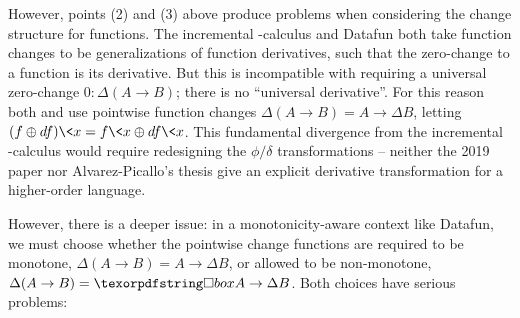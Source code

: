 However, points (2) and (3) above produce problems when considering the change structure for functions.
%
The incremental \fn-calculus and Datafun both take function changes to be generalizations of function derivatives, such that the zero-change to a function is its derivative.
%
But this is incompatible with requiring a universal zero-change $0 : \Delta (A \to B)$; there is no ``universal derivative''.
%
%
For this reason both \citet{DBLP:conf/esop/Alvarez-Picallo19} and \citet{mario-thesis} use pointwise function changes $\Delta(A \to B) = A \to \Delta B$, letting $(f \oplus df)\<x = f\<x \oplus df\<x$.
%
%
This fundamental divergence from the incremental \fn-calculus would require
redesigning the $\phi/\delta$ transformations -- neither the 2019 paper nor
Alvarez-Picallo's thesis give an explicit derivative transformation for a
higher-order language.

However, there is a deeper issue: in a monotonicity-aware context like Datafun, we must choose whether the pointwise change functions are required to be monotone, $\Delta(A \to B) = A \to \Delta B$, or allowed to be non-monotone, $\Delta(A \to B) = \iso A \to \Delta B$.
%
Both choices have serious problems:

